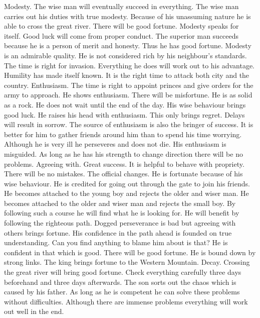 \or {}
	{Modesty. The wise man will eventually succeed in everything.}
	{The wise man carries out his duties with true modesty. Because of his unassuming nature he is
		able to cross the great river. There will be good fortune.}
	{Modesty speaks for itself. Good luck will come from proper conduct.}
	{The superior man succeeds because he is a person of merit and honesty. Thus he has good fortune.}
	{Modesty is an admirable quality.}
	{He is not considered rich by his neighbour's standards. The time is right for invasion.
		Everything he does will work out to his advantage.}
	{Humility has made itself known. It is the right time to attack both city and the country.}
\or {}
	{Enthusiasm. The time is right to appoint princes and give orders for the army to approach.}
	{He shows enthusiasm. There will be misfortune.}
	{He is as solid as a rock. He does not wait until the end of the day. His wise
		behaviour brings good luck.}
	{He raises his head with enthusiasm. This only brings regret. Delays will result in sorrow.}
	{The source of enthusiasm is also the bringer of success. It is better for him to gather
		friends around him than to spend his time worrying.}
	{Although he is very ill he perseveres and does not die.}
	{His enthusiasm is misguided. As long as he has his strength to change direction
		there will be no problems.}
\or {}
	{Agreeing with. Great success. It is helpful to behave with propriety. There will be no mistakes.}
	{The official changes. He is fortunate because of his wise behaviour. He is credited for
		going out through the gate to join his friends.}
	{He becomes attached to the young boy and rejects the older and wiser man.}
	{He becomes attached to the older and wiser man and rejects the small boy. By following such a course
		he will find what he is looking for. He will benefit by following the righteous path.}
	{Dogged perseverance is bad but agreeing with others brings fortune. His confidence
		in the path ahead is founded on true understanding. Can you find anything to blame
		him about is that?}
	{He is confident in that which is good. There will be good fortune.}
	{He is bound down by strong links. The king brings fortune to the Western Mountain.}
\or {}
	{Decay. Crossing the great river will bring good fortune. Check everything carefully three
		days beforehand and three days afterwards.}
	{The son sorts out the chaos which is caused by his father. As long as he is competent
		he can solve these problems without difficulties. Although there are immense problems
		everything will work out well in the end.}
